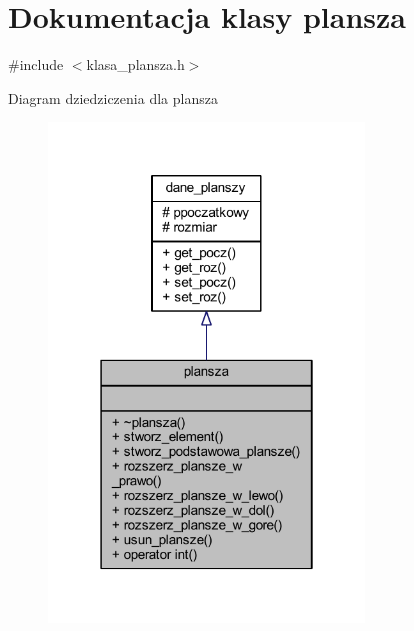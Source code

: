 \hypertarget{classplansza}{}\section{Dokumentacja klasy plansza}
\label{classplansza}


{\ttfamily \#include $<$klasa\+\_\+plansza.\+h$>$}



Diagram dziedziczenia dla plansza
\nopagebreak
\begin{figure}[H]
\begin{center}
\leavevmode
\includegraphics[width=238pt]{classplansza__inherit__graph}
\end{center}
\end{figure}


